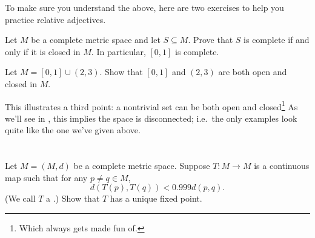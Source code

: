 To make sure you understand the above,
here are two exercises to help you practice relative adjectives.

\begin{exercise}
	Let $M$ be a complete metric space and let $S \subseteq M$.
	Prove that $S$ is complete if and only if it is closed in $M$.
	In particular, $[0,1]$ is complete.
\end{exercise}
\begin{exercise}
	Let $M = [0,1] \cup (2,3)$.
	Show that $[0,1]$ and $(2,3)$ are both open and closed in $M$.
\end{exercise}

This illustrates a third point:
a nontrivial set can be both open and closed\footnote{Which
	always gets made fun of.}
As we'll see in , this implies the space is disconnected;
i.e.\ the only examples look quite like the one we've given above.

\section{\problemhead}
\begin{dproblem}
	Let $M = (M,d)$ be a complete metric space.
	Suppose $T \colon M \to M$ is a continuous map
	such that for any $p \neq q \in M$,
	\[ d\left( T(p), T(q) \right) < 0.999 d(p,q). \]
	(We call $T$ a .)
	Show that $T$ has a unique fixed point.
\end{dproblem}

